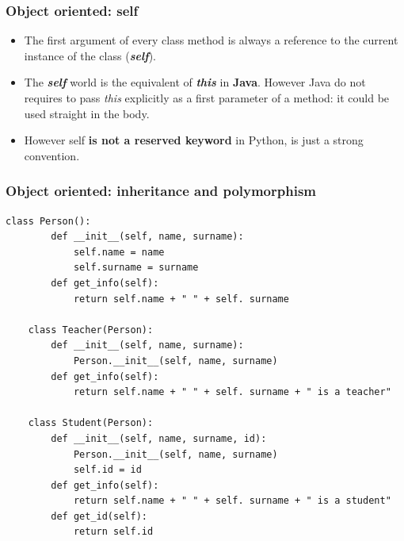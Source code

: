 \documentclass[xcolor ={table,usenames,dvipsnames}]{beamer}
\theoremstyle{definition}
\begin{document}
	\begin{frame}[fragile]
		\frametitle{Object oriented: self}
		\begin{itemize}
			\item The first argument of every class method is always a reference to the current instance of the class (\textit{\textbf{self}}).
			\item The \textbf{\textit{self}} world is the equivalent of \textbf{\textit{this}} in \textbf{Java}. However Java do not requires to pass \textit{this} explicitly as a first parameter of a method: it could be used straight in the body.
			\item However self\textbf{ is not a reserved keyword} in Python, is just a strong convention.
		\end{itemize}
	\end{frame}

	
	\begin{frame}[fragile]
		\frametitle{Object oriented: inheritance and polymorphism}
		\begin{lstlisting}[basicstyle=\fontsize{2}{4}\selectfont\ttfamily\tiny]
	class Person():
		def __init__(self, name, surname):
			self.name = name
			self.surname = surname
		def get_info(self):
			return self.name + " " + self. surname
	
	class Teacher(Person):
		def __init__(self, name, surname):
			Person.__init__(self, name, surname)
		def get_info(self):
			return self.name + " " + self. surname + " is a teacher"
	
	class Student(Person):
		def __init__(self, name, surname, id):
			Person.__init__(self, name, surname)
			self.id = id
		def get_info(self):
			return self.name + " " + self. surname + " is a student"
		def get_id(self):
			return self.id
		\end{lstlisting}
	\end{frame}
	
\end{document}
